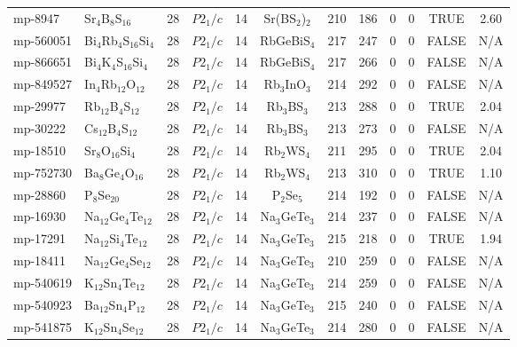 {\begin{longtable}{llcccccccccc}
    mp-8947 & Sr$_{4}$B$_{8}$S$_{16}$ & 28    & $P2_1/c$ & 14    & Sr(BS$_{2}$)$_{2}$ & 210   & 186   & 0     & 0     & TRUE  & 2.60  \\
    mp-560051 & Bi$_{4}$Rb$_{4}$S$_{16}$Si$_{4}$ & 28    & $P2_1/c$ & 14    & RbGeBiS$_{4}$ & 217   & 247   & 0     & 0     & FALSE & N/A \\
    mp-866651 & Bi$_{4}$K$_{4}$S$_{16}$Si$_{4}$ & 28    & $P2_1/c$ & 14    & RbGeBiS$_{4}$ & 217   & 266   & 0     & 0     & FALSE & N/A \\
    mp-849527 & In$_{4}$Rb$_{12}$O$_{12}$ & 28    & $P2_1/c$ & 14    & Rb$_{3}$InO$_{3}$ & 214   & 292   & 0     & 0     & FALSE & N/A \\
    mp-29977 & Rb$_{12}$B$_{4}$S$_{12}$ & 28    & $P2_1/c$ & 14    & Rb$_{3}$BS$_{3}$ & 213   & 288   & 0     & 0     & TRUE  & 2.04  \\
    mp-30222 & Cs$_{12}$B$_{4}$S$_{12}$ & 28    & $P2_1/c$ & 14    & Rb$_{3}$BS$_{3}$ & 213   & 273   & 0     & 0     & FALSE & N/A \\
    mp-18510 & Sr$_{8}$O$_{16}$Si$_{4}$ & 28    & $P2_1/c$ & 14    & Rb$_{2}$WS$_{4}$ & 211   & 295   & 0     & 0     & TRUE  & 2.04  \\
    mp-752730 & Ba$_{8}$Ge$_{4}$O$_{16}$ & 28    & $P2_1/c$ & 14    & Rb$_{2}$WS$_{4}$ & 213   & 310   & 0     & 0     & TRUE  & 1.10  \\
    mp-28860 & P$_{8}$Se$_{20}$ & 28    & $P2_1/c$ & 14    & P$_{2}$Se$_{5}$ & 214   & 192   & 0     & 0     & FALSE & N/A \\
    mp-16930 & Na$_{12}$Ge$_{4}$Te$_{12}$ & 28    & $P2_1/c$ & 14    & Na$_{3}$GeTe$_{3}$ & 214   & 237   & 0     & 0     & FALSE & N/A \\
    mp-17291 & Na$_{12}$Si$_{4}$Te$_{12}$ & 28    & $P2_1/c$ & 14    & Na$_{3}$GeTe$_{3}$ & 215   & 218   & 0     & 0     & TRUE  & 1.94  \\
    mp-18411 & Na$_{12}$Ge$_{4}$Se$_{12}$ & 28    & $P2_1/c$ & 14    & Na$_{3}$GeTe$_{3}$ & 210   & 259   & 0     & 0     & FALSE & N/A \\
    mp-540619 & K$_{12}$Sn$_{4}$Te$_{12}$ & 28    & $P2_1/c$ & 14    & Na$_{3}$GeTe$_{3}$ & 214   & 259   & 0     & 0     & FALSE & N/A \\
    mp-540923 & Ba$_{12}$Sn$_{4}$P$_{12}$ & 28    & $P2_1/c$ & 14    & Na$_{3}$GeTe$_{3}$ & 215   & 240   & 0     & 0     & FALSE & N/A \\
    mp-541875 & K$_{12}$Sn$_{4}$Se$_{12}$ & 28    & $P2_1/c$ & 14    & Na$_{3}$GeTe$_{3}$ & 214   & 280   & 0     & 0     & FALSE & N/A \\

\end{longtable}}
